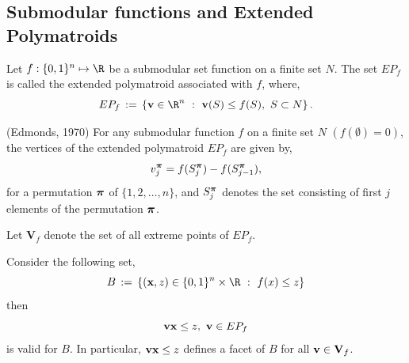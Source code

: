 \documentclass[10pt,twoside]{amsart}
\begin{document}
\subsection{Submodular functions and Extended Polymatroids}
\begin{dfn}
  Let $f:\binset^n \mapsto \R$ be a submodular set function on a finite set $N$. The set $EP_f$ is called the extended polymatroid associated with $f$, where,
  $$
        EP_f \define \set{\bv\in \R^n}{\bv(S) \leq f(S),\,\,S\subset N}.
  $$
\end{dfn}

\begin{thm}
   (Edmonds, 1970) \cite{edmonds03} For any submodular function $f$ on a finite set $N$ $(f(\emptyset) = 0)$, the vertices of the extended polymatroid $EP_f$ are given by,
   $$
        v^{\boldsymbol\pi}_j = f(S^{\boldsymbol\pi}_j) - f(S^{\boldsymbol\pi}_{j-1}),
   $$
   for a permutation $\boldsymbol\pi$ of $\{1,2,\ldots, n\}$, and $S^{\boldsymbol\pi}_j$ denotes the set consisting of first $j$ elements of the permutation $\boldsymbol\pi$.
\end{thm}

\begin{dfn}
  Let $\mathbf{V}_f$ denote the set of all extreme points of $EP_f$.
\end{dfn}

\begin{cor}
\label{cor:extpolymat}
    Consider the following set,
    $$
        B \define \set{(\x, z) \in \binset^n\times \R}{f(x)\leq z}
    $$
    then $$\mathbf{v} \mathbf{x} \leq z, \,\,\mathbf{v} \in EP_f$$ is valid for $B$. In particular, $\mathbf{v} \mathbf{x} \leq z$ defines a facet of $B$ for all $\mathbf{v} \in \mathbf{V}_f$.
\end{cor}

\end{document}
